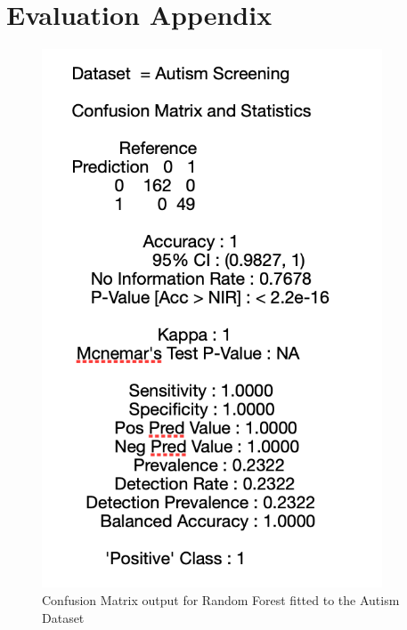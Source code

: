 \chapter{Evaluation Appendix}
\begin{figure}[!htbp]
    \centering
    \begin{minipage}{0.45\textwidth}
        \centering
        \includegraphics[width=0.9\textwidth]{ThesisTemplate/appendix/images/Chapter5Appendix/ConfusionMatrix/Autism.png} 
        \caption{Confusion Matrix output for Random Forest fitted to the Autism Dataset}
        \label{fig:matrixAutism}
    \end{minipage}\hfill
    \begin{minipage}{0.45\textwidth}
        \centering

\end{minipage}
\end{figure}
